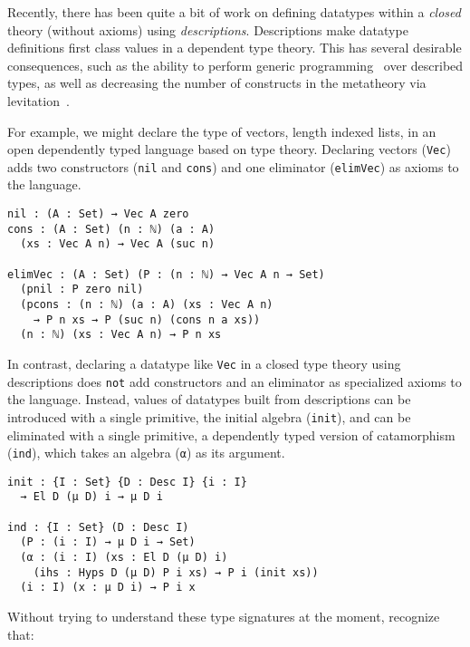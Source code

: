 \documentclass[preprint,nonatbib]{sigplanconf}
\begin{document}

Recently, there has been quite a bit of work on defining datatypes
within a {\it closed}
theory (without axioms) using {\it descriptions}.
Descriptions make datatype definitions first class values in a
dependent type theory. This has several desirable consequences, such as the
ability to perform generic programming~\citep{Chapman:2010:GAL:1932681.1863547,mcbride2010ornamental,dagand:phd}
over described types, as well as decreasing the number of constructs in the
metatheory via
levitation~\citep{Chapman:2010:GAL:1932681.1863547,dagand:phd}. 

For example, we might declare the type of vectors, length indexed
lists, in an open dependently typed language based on
\citet{martin1975intuitionistic} type theory.
Declaring vectors ({\tt Vec})
adds two constructors ({\tt nil} and {\tt cons}) and one
eliminator ({\tt elimVec}) as axioms to the language.

\begin{verbatim}
nil : (A : Set) → Vec A zero
cons : (A : Set) (n : ℕ) (a : A)
  (xs : Vec A n) → Vec A (suc n)

elimVec : (A : Set) (P : (n : ℕ) → Vec A n → Set)
  (pnil : P zero nil)
  (pcons : (n : ℕ) (a : A) (xs : Vec A n)
    → P n xs → P (suc n) (cons n a xs))
  (n : ℕ) (xs : Vec A n) → P n xs
\end{verbatim}

In contrast, declaring a datatype like {\tt Vec} in a closed type
theory using descriptions does {\tt not} add constructors and an
eliminator as specialized axioms to the language. Instead, values of
datatypes built from descriptions can be introduced with a single
primitive, the initial algebra ({\tt init}), and can be eliminated with
a single primitive, a dependently typed version of catamorphism
({\tt ind}), which takes an algebra ({\tt α}) as its argument.

\begin{verbatim}
init : {I : Set} {D : Desc I} {i : I}
  → El D (μ D) i → μ D i

ind : {I : Set} (D : Desc I)
  (P : (i : I) → μ D i → Set)
  (α : (i : I) (xs : El D (μ D) i)
    (ihs : Hyps D (μ D) P i xs) → P i (init xs))
  (i : I) (x : μ D i) → P i x
\end{verbatim}

Without trying to understand these type signatures at the moment,
recognize that:
\end{document}

